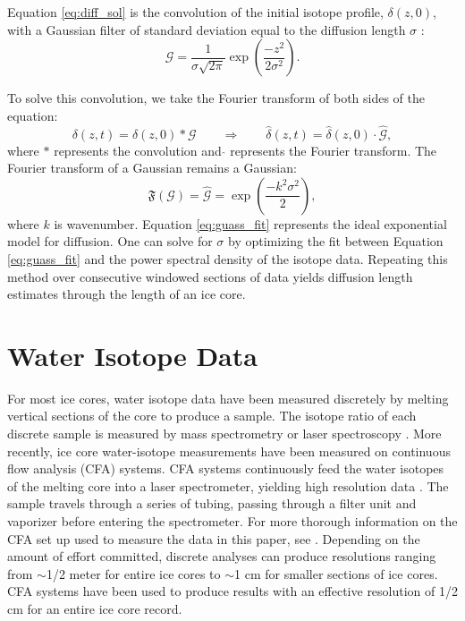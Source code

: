 \documentclass[draft, jgrga]{AGUTeX}
\begin{document}
\begin{article}
Equation \ref{eq:diff_sol} is the convolution of the initial isotope profile, $\delta(z,0)$, with a Gaussian filter of standard deviation equal to the diffusion length $\sigma$ \citep{Johnsen2000}:
\begin{equation}
\mathcal{G} = \frac{1}{\sigma \sqrt{2\pi}} \exp \left( \frac{-z^2}{2\sigma^2} \right).
\end{equation}

To solve this convolution, we take the Fourier transform of both sides of the equation:
\begin{equation}
  \delta(z,t) = \delta(z,0)*\mathcal{G} \qquad \Rightarrow \qquad \hat{\delta}(z,t) = \hat{\delta}(z,0) \cdot \hat{\mathcal{G}},
\end{equation}
where $*$ represents the convolution and \quad $\hat{}$ \quad represents the Fourier transform. The Fourier transform of a Gaussian remains a Gaussian:
\begin{equation}
  \label{eq:guass_fit}
\mathfrak{F}(\mathcal{G}) = \hat{\mathcal{G}} = \exp \left( \frac{-k^2\sigma^2}{2} \right),
\end{equation}
where $k$ is wavenumber. Equation \ref{eq:guass_fit} represents the ideal exponential model for diffusion. One can solve for $\sigma$ by optimizing the fit between Equation \ref{eq:guass_fit} and the power spectral density of the isotope data. Repeating this method over consecutive windowed sections of data yields diffusion length estimates through the length of an ice core.


\section{Water Isotope Data}

For most ice cores, water isotope data have been measured discretely by melting vertical sections of the core to produce a sample. The isotope ratio of each discrete sample is measured by mass spectrometry or laser spectroscopy \citep{Kerstel1999, Lis2008, Gupta2009, Brand2009}. More recently, ice core water-isotope measurements have been measured on continuous flow analysis (CFA) systems. CFA systems continuously feed the water isotopes of the melting core into a laser spectrometer, yielding high resolution data \citep{Gkinis2011a,Emanuelsson2015,Jones2017b}. The sample travels through a series of tubing, passing through a filter unit and vaporizer before entering the spectrometer. For more thorough information on the CFA set up used to measure the data in this paper, see \citet{Jones2017b}. Depending on the amount of effort committed, discrete analyses can produce resolutions ranging from $\sim$1/2 meter for entire ice cores to $\sim$1 cm for smaller sections of ice cores. CFA systems have been used to produce results with an effective resolution of 1/2 cm for an entire ice core record.


\end{article}
\end{document}
